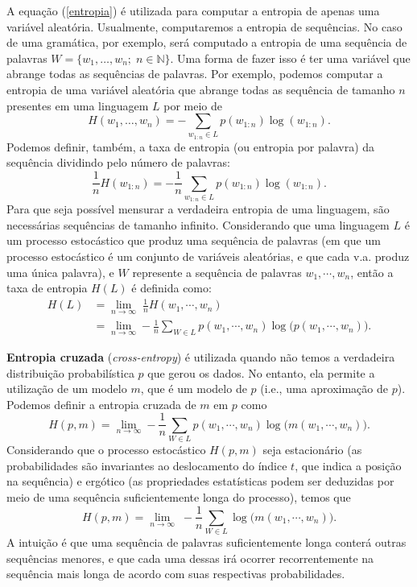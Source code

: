 \documentclass{automatextcc}
\newcommand{\N}{\mathds{N}}
\begin{document}
A equação (\ref{entropia}) é utilizada para computar a entropia de apenas uma variável aleatória. Usualmente, computaremos a entropia de sequências. No caso de uma gramática, por exemplo, será computado a entropia de uma sequência de palavras $W = \{w_1,\dots,w_n; \; n \in \N \}$. Uma forma de fazer isso é ter uma variável que abrange todas as sequências de palavras. Por exemplo, podemos computar a entropia de uma variável aleatória que abrange todas as sequência de tamanho $n$ presentes em uma linguagem $L$ por meio de
\begin{equation*}
    H(w_1,\dots,w_n) = - \sum_{w_{1:n} \in L} p(w_{1:n}) \log(w_{1:n}).
\end{equation*}
Podemos definir, também, a taxa de entropia (ou entropia por palavra) da sequência dividindo pelo número de palavras:
\begin{equation*}
    \frac{1}{n}H(w_{1:n}) = - \frac{1}{n} \sum_{w_{1:n} \in L}  p(w_{1:n}) \log(w_{1:n}).
\end{equation*}
Para que seja possível mensurar a verdadeira entropia de uma linguagem, são necessárias sequências de tamanho infinito. Considerando que uma linguagem $L$ é um processo estocástico que produz uma sequência de palavras (em que um processo estocástico é um conjunto de variáveis aleatórias, e que cada v.a. produz uma única palavra), e $W$ represente a sequência de palavras $w_1,\cdots,w_n$, então a taxa de entropia $H(L)$ é definida como:
\begin{align*}
    H(L) & = \lim_{n \rightarrow \infty} \; \frac{1}{n} H(w_1,\cdots,w_n) \\
         & = \lim_{n \rightarrow \infty} - \frac{1}{n} \sum_{W \in L}  p(w_1,\cdots,w_n)  \log\big(p(w_1,\cdots,w_n)\big).
\end{align*}

\textbf{Entropia cruzada} (\textit{cross-entropy}) é utilizada quando não temos a verdadeira distribuição probabilística $p$ que gerou os dados. No entanto, ela permite a utilização de um modelo $m$, que é um modelo de $p$ (i.e., uma aproximação de $p$). Podemos definir a entropia cruzada de $m$ em $p$ como
\begin{equation*}
    H(p,m) = \lim_{n \rightarrow \infty}  - \frac{1}{n} \sum_{W \in L}  p(w_1,\cdots,w_n) \log\big(m(w_1,\cdots,w_n)\big) .
\end{equation*}
Considerando que o processo estocástico $H(p,m)$ seja estacionário (as probabilidades são invariantes ao deslocamento do índice $t$, que indica a posição na sequência) e ergótico (as propriedades estatísticas podem ser deduzidas por meio de uma sequência suficientemente longa do processo), temos que
\begin{equation}
    H(p,m) = \lim_{n \rightarrow \infty} \; - \frac{1}{n} \sum_{W \in L} \log\big(m(w_1,\cdots,w_n)\big).
\end{equation}
A intuição é que uma sequência de palavras suficientemente longa conterá outras sequências menores, e que cada uma dessas irá ocorrer recorrentemente na sequência mais longa de acordo com suas respectivas probabilidades.
\end{document}
